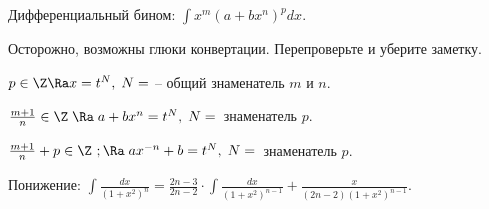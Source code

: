 \documentclass{article}
\begin{document}






Дифференциальный бином: $\int x^m(a+bx^n)^pdx$.
\begin{petit}
  Осторожно, возможны глюки конвертации. Перепроверьте и уберите
  заметку.
\end{petit}
 $p \in \Z \Ra x=t^N, \; N=$ -- общий знаменатель $m$ и $n$.

 $\frac{m+1}{n} \in \Z \; \Ra \; a+bx^n=t^N, \;N=$~знаменатель $p$.

 $\frac{m+1}{n}+p \in \Z \ ;\Ra \; ax^{-n}+b=t^N, \; N=$~знаменатель $p$.

Понижение: $\int\frac{dx}{(1+x^2)^n}=\frac{2n-3}{2n-2}\cdot\int\frac{dx}{(1+x^2)^{n-1}}+\frac{x}{(2n-2)(1+x^2)^{n-1}}$.
\end{document}
